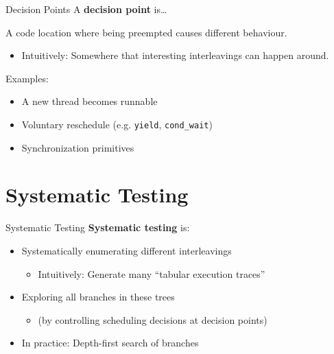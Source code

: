 \documentclass[xcolor=dvipsnames]{beamer}
\begin{document}
\begin{frame}{Decision Points} %
	A {\bf decision point} is\ldots

	\linegap
	A code location where being preempted causes different behaviour.
	\begin{itemize}
		\item Intuitively: Somewhere that interesting interleavings can happen around.
	\end{itemize}
	Examples:
	\begin{itemize}
		\item A new thread becomes runnable
		\item Voluntary reschedule (e.g. \texttt{yield}, \texttt{cond\_wait})
		\item Synchronization primitives
	\end{itemize}
\end{frame}



\section{Systematic Testing}


\begin{frame}{Systematic Testing}
	\textbf{Systematic testing} is:
	\begin{itemize}
		\item Systematically enumerating different interleavings
		\begin{itemize}
			\item Intuitively: Generate many ``tabular execution traces''
		\end{itemize}
		\item Exploring all branches in these trees
		\begin{itemize}
			\item (by controlling scheduling decisions at decision points)
		\end{itemize}
		\item In practice: Depth-first search of branches
	\end{itemize}
\end{frame}
\end{document}
